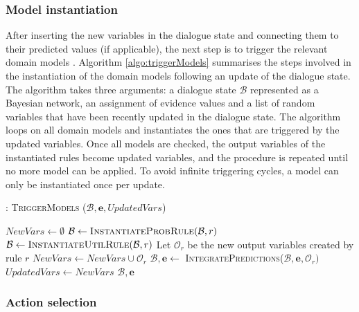 \subsubsection*{Model instantiation}

After inserting the new variables in the dialogue state and connecting them to their predicted values (if applicable), the next step is to trigger the relevant domain models . Algorithm \ref{algo:triggerModels} summarises the steps involved in the instantiation of the domain models following an update of the dialogue state. The algorithm takes three arguments: a dialogue state $\mathcal{B}$ represented as a Bayesian network, an assignment of evidence values and a list of random variables that have been recently updated in the dialogue state. The algorithm loops on all domain models and instantiates the ones that are triggered by the updated variables. Once all models are checked, the output variables of the instantiated rules become updated variables, and the procedure is repeated until no more model can be applied.  To avoid infinite triggering cycles, a model can only be instantiated once per update. 


\begin{algorithm}[h]
\caption{: \textsc{TriggerModels} ($\mathcal{B}, \mathbf{e}, \mathit{UpdatedVars}$)}
\begin{algorithmic}[1] \vspace{1mm}
\STATE $\mathit{NewVars} \leftarrow \emptyset$
\STATE $\mathcal{B} \leftarrow \textsc{InstantiateProbRule}(\mathcal{B},r)$
\STATE $\mathcal{B} \leftarrow \textsc{InstantiateUtilRule}(\mathcal{B},r)$
\ENDIF
\STATE Let $\mathcal{O}_r$ be the new output variables created by rule $r$
\STATE $\mathit{NewVars} \leftarrow \mathit{NewVars} \cup \mathcal{O}_r$
\STATE $\mathcal{B}, \mathbf{e} \leftarrow $ \textsc{IntegratePredictions}($\mathcal{B}, \mathbf{e}, \mathcal{O}_r)$
\ENDFOR
\ENDIF
\ENDFOR 
\STATE $\mathit{UpdatedVars} \leftarrow \mathit{NewVars}$
\ENDWHILE 
\RETURN $\mathcal{B}, \mathbf{e}$
\end{algorithmic}
\label{algo:triggerModels}
\end{algorithm}

\subsubsection*{Action selection}

